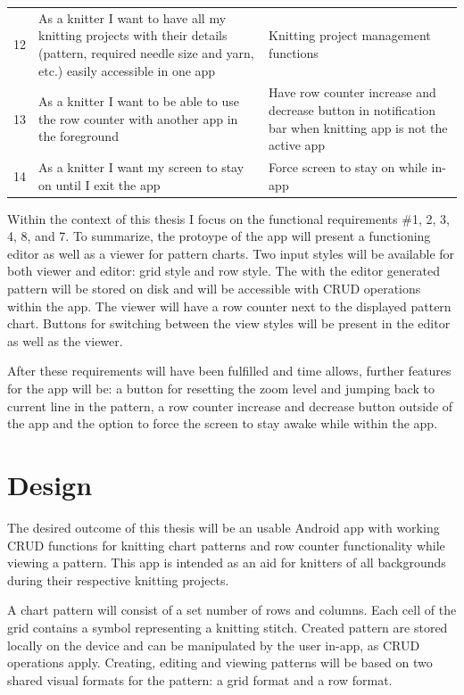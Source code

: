 \documentclass[a4paper,11pt]{kth-mag}
\begin{document}
\begin{landscape}
\begin{table}
\begin{tabular}{ c | p{10cm} | p{10cm} }
12 & As a knitter I want to have all my knitting projects with their details (pattern, required needle size and yarn, etc.) easily accessible in one app & Knitting project management functions  \\
13 & As a knitter I want to be able to use the row counter with another app in the foreground &  Have row counter increase and decrease button in notification bar when knitting app is not the active app \\
14 & As a knitter I want my screen to stay on until I exit the app & Force screen to stay on while in-app \\
\end{tabular}
\end{table}
\end{landscape}

Within the context of this thesis I focus on the functional requirements \#1, 2, 3, 4, 8, and 7. To summarize, the protoype of the app will present a functioning editor as well as a viewer for pattern charts. Two input styles will be available for both viewer and editor: grid style and row style. The with the editor generated pattern will be stored on disk and will be accessible with CRUD operations within the app. The viewer will have a row counter next to the displayed pattern chart. Buttons for switching between the view styles will be present in the editor as well as the viewer.

After these requirements will have been fulfilled and time allows, further features for the app will be: a button for resetting the zoom level and jumping back to current line in the pattern, a row counter increase and decrease button outside of the app and the option to force the screen to stay awake while within the app.

\chapter{Design}
The desired outcome of this thesis will be an usable Android app with working CRUD functions for knitting chart patterns and row counter functionality while viewing a pattern. This app is intended as an aid for knitters of all backgrounds during their respective knitting projects.

A chart pattern will consist of a set number of rows and columns. Each cell of the grid contains a symbol representing a knitting stitch. Created pattern are stored locally on the device and can be manipulated by the user in-app, as CRUD operations apply. Creating, editing and viewing patterns will be based on two shared visual formats for the pattern: a grid format and a row format.
\end{document}
